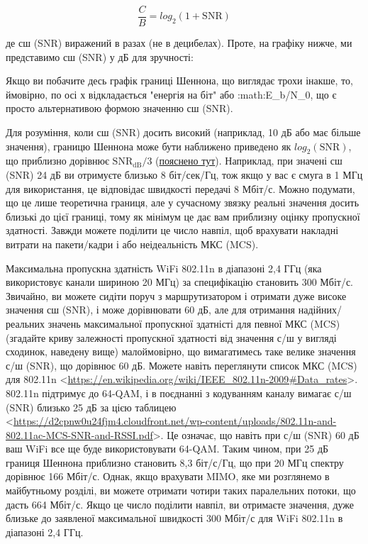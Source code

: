 \[\frac{C}{B} = log_2 \left( 1 + \mathrm{SNR}   \right)\]

де сш (SNR) виражений в разах (не в децибелах). Проте, на графіку нижче,
ми представимо сш (SNR) у дБ для зручності:

\href{../_images/shannon_limit.svg}{}

Якщо ви побачите десь графік границі Шеннона, що виглядає трохи інакше,
то, ймовірно, по осі х відкладається "енергія на біт" або
:math:E\_b/N\_0, що є просто альтернативою формою значенню сш (SNR).

Для розуміння, коли сш (SNR) досить високий (наприклад, 10 дБ або має
більше значення), границю Шеннона може бути наближено приведено як
\(log_2 \left( \mathrm{SNR} \right)\), що приблизно дорівнює
\(\mathrm{SNR_{dB}}/3\)
(\href{https://en.wikipedia.org/wiki/Shannon\%E2\%80\%93Hartley_theorem\#Bandwidth-limited_case}{пояснено
тут}). Наприклад, при значені сш (SNR) 24 дБ ви отримуєте близько 8
біт/сек/Гц, тож якщо у вас є смуга в 1 МГц для використання, це
відповідає швидкості передачі 8 Мбіт/с. Можно подумати, що це лише
теоретична границя, але у сучасному зв\textquotesingle язку реальні
значення досить близькі до цієї границі, тому як мінімум це дає вам
приблизну оцінку пропускної здатності. Завжди можете поділити це число
навпіл, щоб врахувати накладні витрати на пакети/кадри і або
неідеальність МКС (MCS).

Максимальна пропускна здатність WiFi 802.11n в діапазоні 2,4 ГГц (яка
використовує канали шириною 20 МГц) за специфікацію становить 300
Мбіт/с. Звичайно, ви можете сидіти поруч з маршрутизатором і отримати
дуже високе значення сш (SNR), і може дорівнювати 60 дБ, але для
отримання надійних/реальних значень максимальної пропускної здатністі
для певної МКС (MCS) (згадайте криву залежності пропускної здатності від
значення с/ш у вигляді сходинок, наведену вище) малоймовірно, що
вимагатимесь таке велике значення с/ш (SNR), що дорівнює 60 дБ. Можете
навіть переглянути список МКС (MCS) для 802.11n
\textless{}\url{https://en.wikipedia.org/wiki/IEEE_802.11n-2009\#Data_rates}\textgreater.
802.11n підтримує до 64-QAM, і в поєднанні з кодуванням каналу вимагає
с/ш (SNR) близько 25 дБ за цією таблицею
\textless{}\url{https://d2cpnw0u24fjm4.cloudfront.net/wp-content/uploads/802.11n-and-802.11ac-MCS-SNR-and-RSSI.pdf}\textgreater.
Це означає, що навіть при с/ш (SNR) 60 дБ ваш WiFi все ще буде
використовувати 64-QAM. Таким чином, при 25 дБ границя Шеннона приблизно
становить 8,3 біт/с/Гц, що при 20 МГц спектру дорівнює 166 Мбіт/с.
Однак, якщо врахувати MIMO, яке ми розглянемо в майбутньому розділі, ви
можете отримати чотири таких паралельних потоки, що дасть 664 Мбіт/с.
Якщо це число поділити навпіл, ви отримаєте значення, дуже близьке до
заявленої максимальної швидкості 300 Мбіт/с для WiFi 802.11n в діапазоні
2,4 ГГц.

